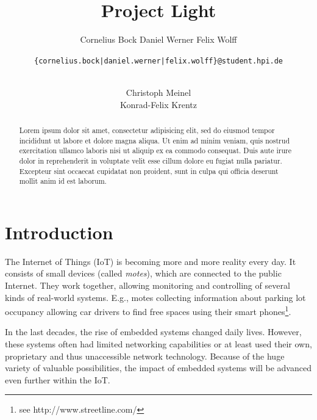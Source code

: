 \documentclass{sig-alternate} %
\begin{document}
\title{Project Light}


\author{
\alignauthor
Cornelius Bock
%
\alignauthor
Daniel Werner
%
\alignauthor
Felix Wolff
%
\and
\texttt{\{cornelius.bock|daniel.werner|felix.wolff\}@student.hpi.de} \\ \\
\and
\alignauthor
Christoph Meinel\\
%
\alignauthor
Konrad-Felix Krentz\\
}

\maketitle

\begin{abstract}
Lorem ipsum dolor sit amet, consectetur adipisicing elit, sed do eiusmod
tempor incididunt ut labore et dolore magna aliqua. Ut enim ad minim veniam,
quis nostrud exercitation ullamco laboris nisi ut aliquip ex ea commodo
consequat. Duis aute irure dolor in reprehenderit in voluptate velit esse
cillum dolore eu fugiat nulla pariatur. Excepteur sint occaecat cupidatat non
proident, sunt in culpa qui officia deserunt mollit anim id est laborum.
\end{abstract}




\section{Introduction}
\label{sec:introduction}

The Internet of Things (IoT) is becoming more and more reality every day.
It consists of small devices (called \textit{motes}), which are connected to the public Internet.
They work together, allowing monitoring and controlling of several kinds of real-world systems. %
E.g., motes collecting information about parking lot occupancy allowing car drivers to find free spaces using their smart phones\footnote{see http://www.streetline.com/}.

In the last decades, the rise of embedded systems changed daily lives. %
However, these systems often had limited networking capabilities or at least used their own, proprietary and thus unaccessible network technology.
Because of the huge variety of valuable possibilities, the impact of embedded systems will be advanced even further within the IoT.
\end{document}
